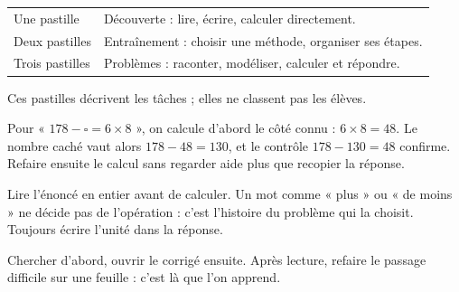 \clearpage\thispagestyle{otFront}\label{mode-emploi}\fontsize{11}{15}\selectfont

\begin{tabularx}{\linewidth}{@{}lY@{}}\toprule
Une pastille & Découverte : lire, écrire, calculer directement.\\[3mm]
Deux pastilles & Entraînement : choisir une méthode, organiser ses étapes.\\[3mm]
Trois pastilles & Problèmes : raconter, modéliser, calculer et répondre.\\\bottomrule
\end{tabularx}\par\medskip
Ces pastilles décrivent les tâches ; elles ne classent pas les élèves.\par\medskip
\begin{exemple}Pour « $178-\square=6\times8$ », on calcule
d’abord le côté connu : $6\times8=48$. Le nombre caché vaut alors
$178-48=130$, et le contrôle $178-130=48$ confirme. Refaire ensuite
le calcul sans regarder aide plus que recopier la réponse.\end{exemple}
\begin{attention}Lire l’énoncé en entier avant de calculer. Un mot comme
« plus » ou « de moins » ne décide pas de l’opération : c’est l’histoire
du problème qui la choisit. Toujours écrire l’unité dans la réponse.\end{attention}
Chercher d’abord, ouvrir le corrigé ensuite. Après lecture, refaire le
passage difficile sur une feuille : c’est là que l’on apprend.

\clearpage

